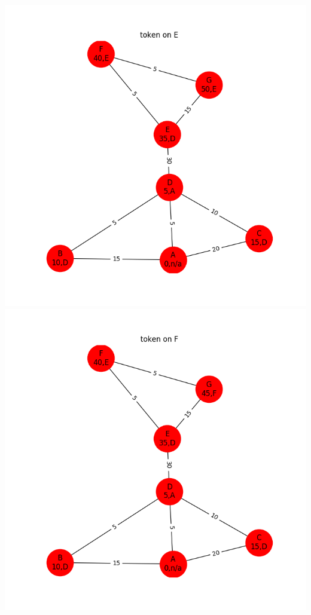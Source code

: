 \documentclass{article}
\begin{document}
\begin{enumerate}
\begin{enumerate}
    \includegraphics[width=\textwidth,height=\textheight,keepaspectratio]{4a5}
    \includegraphics[width=\textwidth,height=\textheight,keepaspectratio]{4a6}

\end{enumerate}
\end{enumerate}
\end{document}
